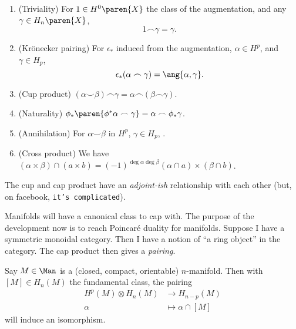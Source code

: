 \begin{prop}
    \hfill
    \begin{enumerate}
        \item (Triviality) For $1 \in {H}^{0}\paren{X}$ the class of the augmentation, and any $\gamma \in {H}_{n}\paren{X}$, 
            \[
                1 \frown \gamma = \gamma.
            \]

        \item (Krönecker pairing) For $\epsilon_*$ induced from the augmentation, $\alpha \in H^p$, and $\gamma \in H_p$, 
        \[
            \epsilon_*(\alpha \frown \gamma) = \ang{\alpha, \gamma}.
        \]

        \item (Cup product) $(\alpha \smile \beta) \frown \gamma = \alpha \frown (\beta \frown \gamma)$.
        \item (Naturality)  $\phi_* \paren{\phi^* \alpha \frown \gamma} = \alpha \frown \phi_* \gamma$.
        \item (Annihilation) For $\alpha \smile \beta$ in $H^p$, $\gamma \in H_p$, \TODO.
        \item (Cross product) We have $(\alpha \times \beta) \cap (a \times b) = (-1)^{\deg \alpha \deg \beta} (\alpha \cap a ) \times (\beta \cap b)$. 
    \end{enumerate}
\end{prop}

The cup and cap product have an \emph{adjoint-ish} relationship with each other (but, on facebook, \texttt{it's complicated}).

\begin{note}[]
    Manifolds will have a canonical class to cap with. The purpose of the development now is to reach Poincaré duality for manifolds. 
    Suppose I have a symmetric monoidal category. Then I have a notion of ``a ring object'' in the category. The cap product then gives a \emph{pairing}.
\end{note}
 
\begin{rem}
    Say $M \in \Man$ is a (closed, compact, orientable) $n$-manifold. 
    Then with $[M] \in H_n(M)$ the fundamental class, the pairing 
    \begin{align*}
        H^p(M) \otimes H_n(M) & \to H_{n-p}(M)\\
        \alpha & \mapsto \alpha \cap [M]
    \end{align*}
    will induce an isomorphism.
\end{rem}

